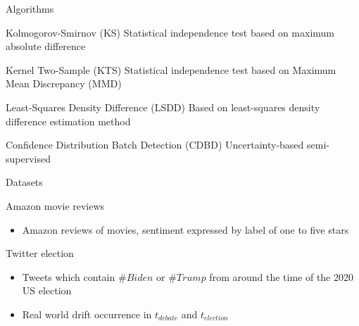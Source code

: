 \documentclass{beamer} %
\begin{document}
	\begin{frame}{Algorithms}
		\begin{alertblock}{Kolmogorov-Smirnov (KS)}
			\vspace{0.1cm}\hspace{1cm} Statistical independence test based on maximum absolute difference
		\end{alertblock}
	
		\begin{alertblock}{Kernel Two-Sample (KTS)}
			\vspace{0.1cm}\hspace{1cm} Statistical independence test based on
Maximum Mean Discrepancy (MMD)
		\end{alertblock}
	
		\begin{alertblock}{Least-Squares Density Difference (LSDD)}
			\vspace{0.1cm}\hspace{1cm} Based on least-squares
density difference estimation
method
		\end{alertblock}
	
		\begin{alertblock}{Confidence Distribution Batch Detection (CDBD)}
			\vspace{0.1cm}\hspace{1cm} Uncertainty-based semi-supervised
		\end{alertblock}
	\end{frame}

	\begin{frame}{Datasets}
		
		\begin{alertblock}{Amazon movie reviews}
			\begin{itemize}
				\item Amazon reviews of movies, sentiment expressed by label of one to five stars
			\end{itemize}
		\end{alertblock}
	
		\begin{alertblock}{Twitter election}
			\begin{itemize}
				\item Tweets which contain $\#Biden$ or $\#Trump$ from around the time of the 2020 US election
				\item Real world drift occurrence in $t_{debate}$ and $t_{election}$
			\end{itemize}
		\end{alertblock}
	\end{frame}
\end{document}
